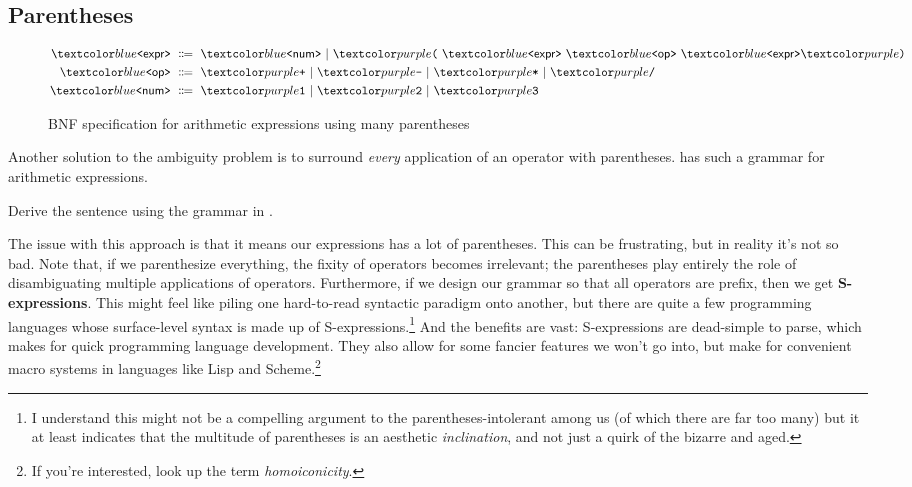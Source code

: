 \subsection{Parentheses}

\begin{figure}
\begin{align*}
\bnfnt{expr} &\bnfeq
\bnfnt{num} \bnfalt
\bnft{(} \ \bnfnt{expr} \ \bnfnt{op} \ \bnfnt{expr} \bnft{)} \\
\bnfnt{op} &\bnfeq \bnft{+} \bnfalt \bnft{-} \bnfalt \bnft{*} \bnfalt \bnft{/} \\
\bnfnt{num} &\bnfeq \bnft{1} \bnfalt \bnft{2} \bnfalt \bnft{3}
\end{align*}
\caption{BNF specification for arithmetic expressions using many parentheses}
\label{fig:arith-paren}
\end{figure}

Another solution to the ambiguity problem is to surround \textit{every} application of an operator with parentheses.
 has such a grammar for arithmetic expressions.
%
\begin{exercise}
Derive the sentence  using the grammar in .
\end{exercise}
%
The issue with this approach is that it means our expressions has a lot of parentheses.
This can be frustrating, but in reality it's not so bad.
Note that, if we parenthesize everything, the fixity of operators becomes irrelevant; the parentheses play entirely the role of disambiguating multiple applications of operators.
Furthermore, if we design our grammar so that all operators are prefix, then we get \textbf{S-expressions}.
This might feel like piling one hard-to-read syntactic paradigm onto another, but there are quite a few programming languages whose surface-level syntax is made up of S-expressions.\footnote{
  I understand this might not be a compelling argument to the parentheses-intolerant among us (of which there are far too many) but it at least indicates that the multitude of parentheses is an aesthetic \textit{inclination}, and not just a quirk of the bizarre and aged.
}
And the benefits are vast: S-expressions are dead-simple to parse, which makes for quick programming language development.
They also allow for some fancier features we won't go into, but make for convenient macro systems in languages like Lisp and Scheme.\footnote{
  If you're interested, look up the term \textit{homoiconicity}.
}

